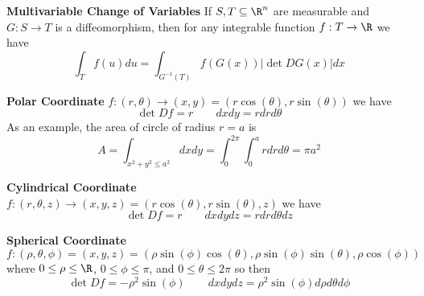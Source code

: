 \documentclass[11pt]{article}
\begin{document}
\begin{theorem*}
  \textbf{Multivariable Change of Variables} If $S,T\subseteq \R^n$ are measurable and $G:S\to T$ is a diffeomorphism, then for any integrable function $f:T\to \R$ we have
  \[
    \int_{T} f(u)du = \int_{G^{-1}(T)} f(G(x)) |\det DG(x)|dx
  \]
  \begin{rem}
    \begin{eumerate}
      \item \textbf{Polar Coordinate} $f:(r, \theta) \to (x,y) = (r\cos(\theta), r\sin(\theta))$ we have
      \[
        \det Df = r \quad \quad dxdy = rdrd\theta
      \]
      As an example, the area of circle of radius $r = a$ is
      \[
        A = \int_{x^2 + y^2 \leq a^2} dxdy = \int_0^{2\pi} \int_0^a r drd\theta = \pi a^2
      \]
      \item \textbf{Cylindrical Coordinate} $f:(r, \theta, z) \to (x, y, z) = (r\cos(\theta), r\sin(\theta), z)$ we have
      \[
        \det Df = r \quad\quad dxdydz = r drd\theta dz
      \]
      \item \textbf{Spherical Coordinate} $f: (\rho, \theta,\phi) = (x,y,z) = (\rho\sin(\phi)\cos(\theta), \rho\sin(\phi)\sin(\theta), \rho\cos(\phi))$ where $0 \leq\rho \leq \R$, $0 \leq \phi \leq \pi$, and $0\leq \theta \leq 2\pi$ so then
      \[
        \det Df = -\rho^2 \sin(\phi) \quad\quad dxdydz = \rho^2\sin(\phi)d\rho d\theta d\phi
      \]
      \end{eumerate}
  \end{rem}
\end{theorem*}
\end{document}
